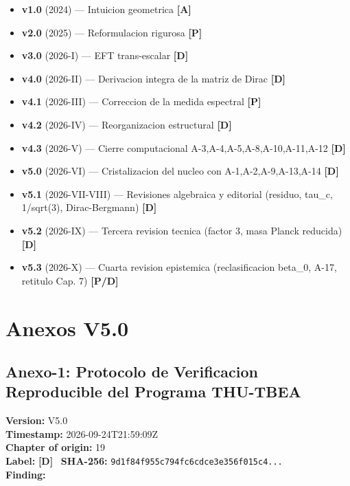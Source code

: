 ﻿\documentclass[11pt,letterpaper]{article}
\begin{document}
\begin{itemize}[leftmargin=*]
\item \textbf{v1.0} (2024) --- Intuicion geometrica \textcolor{Ayellow}{\textbf{[A]}}
\item \textbf{v2.0} (2025) --- Reformulacion rigurosa \textcolor{Ppurple}{\textbf{[P]}}
\item \textbf{v3.0} (2026-I) --- EFT trans-escalar \textcolor{Dgreen}{\textbf{[D]}}
\item \textbf{v4.0} (2026-II) --- Derivacion integra de la matriz de Dirac \textcolor{Dgreen}{\textbf{[D]}}
\item \textbf{v4.1} (2026-III) --- Correccion de la medida espectral \textcolor{Ppurple}{\textbf{[P]}}
\item \textbf{v4.2} (2026-IV) --- Reorganizacion estructural \textcolor{Dgreen}{\textbf{[D]}}
\item \textbf{v4.3} (2026-V) --- Cierre computacional A-3,A-4,A-5,A-8,A-10,A-11,A-12 \textcolor{Dgreen}{\textbf{[D]}}
\item \textbf{v5.0} (2026-VI) --- Cristalizacion del nucleo con A-1,A-2,A-9,A-13,A-14 \textcolor{Dgreen}{\textbf{[D]}}
\item \textbf{v5.1} (2026-VII-VIII) --- Revisiones algebraica y editorial (residuo, tau\_c, 1/sqrt(3), Dirac-Bergmann) \textcolor{Dgreen}{\textbf{[D]}}
\item \textbf{v5.2} (2026-IX) --- Tercera revision tecnica (factor 3, masa Planck reducida) \textcolor{Dgreen}{\textbf{[D]}}
\item \textbf{v5.3} (2026-X) --- Cuarta revision epistemica (reclasificacion beta\_0, A-17, retitulo Cap. 7) \textcolor{Ppurple}{\textbf{[P/D]}}
\end{itemize}

\newpage
\section*{Anexos V5.0}

\subsection*{Anexo-1: Protocolo de Verificacion Reproducible del Programa THU-TBEA}
\textbf{Version:} V5.0 \\
\textbf{Timestamp:} 2026-09-24T21:59:09Z \\
\textbf{Chapter of origin:} 19 \\
\textbf{Label:} \textcolor{Dgreen}{\textbf{[D]}} \
\textbf{SHA-256:} \texttt{9d1f84f955c794fc6cdce3e356f015c4...} \\[0.5em]
\textbf{Finding:}
\end{document}
